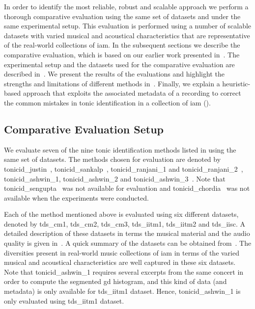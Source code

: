 In order to identify the most reliable, robust and scalable approach we perform a thorough comparative evaluation using the same set of datasets and under the same experimental setup. This evaluation is performed using a number of scalable datasets with varied musical and acoustical characteristics that are representative of the real-world collections of \gls{iam}. In the subsequent sections we describe the comparative evaluation, which is based on our earlier work presented in~\cite{Gulati2014Tonic}.  The experimental setup and the datasets used for the comparative evaluation are described in~. We present the results of the evaluations and highlight the strengths and limitations of different methods in~. Finally, we explain a heuristic-based approach that exploits the associated metadata of a recording to correct the common mistakes in tonic identification in a collection of \gls{iam} (). 


\subsection{Comparative Evaluation Setup}
\label{sec:pre_processing_experimental_setup}

We evaluate seven of the nine tonic identification methods listed in  using the same set of datasets. The methods chosen for evaluation are
denoted by \acrshort{tonicid_justin}~\citep{salamon2012multipitch}, \acrshort{tonicid_sankalp}~\citep{gulati2012two}, \acrshort{tonicid_ranjani_1} and \acrshort{tonicid_ranjani_2}~\citep{ranjani2011carnatic}, \acrshort{tonicid_ashwin_1}, \acrshort{tonicid_ashwin_2} and \acrshort{tonicid_ashwin_3}~\citep{bellur2012knowledge}. Note that \acrshort{tonicid_sengupta}~\citep{Sengupta2005b} was not available for
evaluation and \acrshort{tonicid_chordia}~\citep{chordia2013joint} was not available when the experiments were conducted. 

Each of the method mentioned above is evaluated using six different datasets, denoted by \acrshort{tds_cm1}, \acrshort{tds_cm2}, \acrshort{tds_cm3}, \acrshort{tds_iitm1}, \acrshort{tds_iitm2} and \acrshort{tds_iisc}. A detailed description of these datasets in terms the musical material and the audio quality is given in~. A quick summary of the datasets can be obtained from~. The diversities present in real-world music collections of \gls{iam} in terms of the varied musical and acoustical characteristics are well captured in these six datasets. Note that \acrshort{tonicid_ashwin_1} requires several excerpts from the same concert in order to compute the segmented \gls{gd} histogram, and this kind of data (and metadata) is only available for \acrshort{tds_iitm1} dataset. Hence, \acrshort{tonicid_ashwin_1} is only evaluated using \acrshort{tds_iitm1} dataset.


